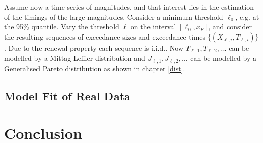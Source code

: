 \documentclass[honours,12pt]{UNSWthesis}
\newcommand{\1}{\mathbf 1}
\numberwithin{equation}{section}
\theoremstyle{definition}
\theoremstyle{remark}
\begin{document}
Assume now a time series of magnitudes, and that interest lies in the estimation of the timings of the large magnitudes.
Consider a minimum threshold $\ell_0$, e.g. at the 95\% quantile.
Vary the threshold $\ell$ on the interval $[\ell_0, x_F]$, and consider
the resulting sequences of exceedance sizes and exceedance times 
$\{(X_{\ell,i}, T_{\ell,i})\}$. 
Due to the renewal property each sequence is i.i.d.. Now $T_{\ell,1}, T_{\ell,2}, \ldots$ can be modelled by a Mittag-Leffler distribution and $J_{\ell,1}, J_{\ell,2}, \ldots$ can be modelled by a Generalised Pareto distribution as shown in chapter \ref{dist}.
\section{Model Fit of Real Data}

\chapter{Conclusion}


\clearpage
{}


\end{document}
